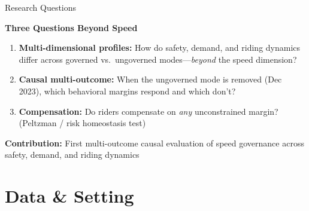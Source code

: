 \documentclass[aspectratio=169, 11pt]{beamer}
\begin{document}
\begin{frame}{Research Questions}
\begin{center}
\large\color{UMNMaroon}\textbf{Three Questions Beyond Speed}
\end{center}

\vspace{0.3cm}
\begin{enumerate}
\item \textbf{Multi-dimensional profiles:} How do safety, demand, and riding dynamics differ across governed vs.\ ungoverned modes---\textit{beyond} the speed dimension?

\vspace{0.2cm}
\item \textbf{Causal multi-outcome:} When the ungoverned mode is removed (Dec 2023), which behavioral margins respond and which don't?

\vspace{0.2cm}
\item \textbf{Compensation:} Do riders compensate on \textit{any} unconstrained margin? (Peltzman / risk homeostasis test)
\end{enumerate}

\vspace{0.3cm}
\textbf{\color{AccentGreen}Contribution:} First multi-outcome causal evaluation of speed governance across safety, demand, and riding dynamics
\end{frame}

\section{Data \& Setting}
\end{document}
